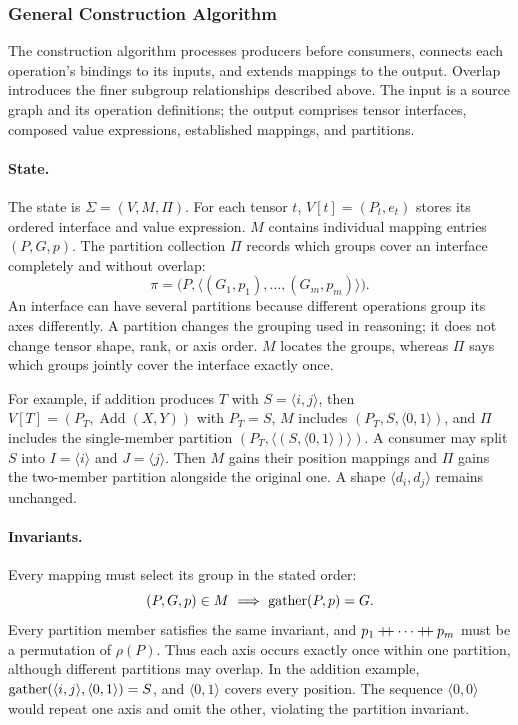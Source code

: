 \FloatBarrier
\subsubsection{General Construction Algorithm}
\label{sec:mapping-algorithm}
The construction algorithm processes producers before consumers, connects each
operation's bindings to its inputs, and extends mappings to the output.
Overlap introduces the finer subgroup relationships described above.
The input is a source graph and its operation definitions; the output comprises
tensor interfaces, composed value expressions, established mappings,
and partitions.

\paragraph{State.}
The state is $\Sigma=(V,M,\Pi)$. For each tensor $t$,
$V[t]=(P_t,e_t)$ stores its ordered interface and value expression.
$M$ contains individual mapping entries $(P,G,p)$. The partition collection
$\Pi$ records which groups cover an interface completely and without overlap:
\begin{equation}
 \pi=\bigl(P,\langle(G_1,p_1),\ldots,(G_m,p_m)\rangle\bigr).
\end{equation}
An interface can have several partitions because different operations group
its axes differently. A partition changes the grouping used in reasoning;
it does not change tensor shape, rank, or axis order. $M$ locates the groups,
whereas $\Pi$ says which groups jointly cover the interface exactly once.

For example, if addition produces $T$ with $S=\langle i,j\rangle$, then
$V[T]=(P_T,\operatorname{Add}(X,Y))$ with $P_T=S$,
$M$ includes $(P_T,S,\langle0,1\rangle)$, and $\Pi$ includes the single-member
partition $(P_T,\langle(S,\langle0,1\rangle)\rangle)$. A consumer may split
$S$ into $I=\langle i\rangle$ and $J=\langle j\rangle$. Then $M$ gains their
position mappings and $\Pi$ gains the two-member partition alongside the
original one. A shape $\langle d_i,d_j\rangle$ remains unchanged.

\paragraph{Invariants.}
Every mapping must select its group in the stated order:
\begin{equation}
 (P,G,p)\in M\ \Longrightarrow\ \operatorname{gather}(P,p)=G.
 \label{eq:mapping-invariant}
\end{equation}
Every partition member satisfies the same invariant, and
$p_1\mathbin{+\!\!+}\cdots\mathbin{+\!\!+} p_m$ must be a permutation of $\rho(P)$.
Thus each axis occurs exactly once within one partition, although different
partitions may overlap. In the addition example,
$\operatorname{gather}(\langle i,j\rangle,\langle0,1\rangle)=S$, and $\langle0,1\rangle$
covers every position. The sequence $\langle0,0\rangle$ would repeat one
axis and omit the other, violating the partition invariant.

